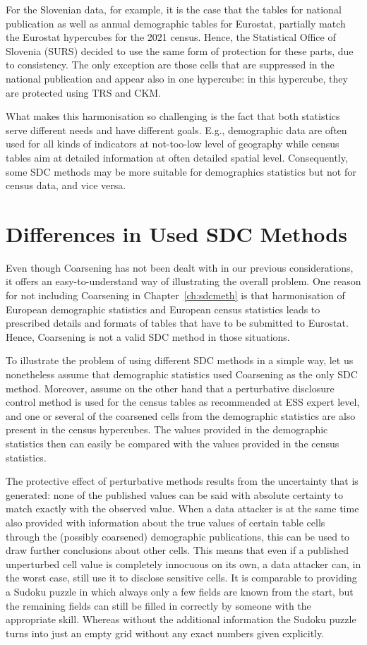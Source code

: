 For the Slovenian data, for example, it is the case that the tables for national publication as well as annual demographic tables for Eurostat, partially match the Eurostat hypercubes for the 2021 census. Hence, the Statistical Office of Slovenia (SURS) decided to use the same form of protection for these parts, due to consistency.
The only exception are those cells that are suppressed in the national publication and appear also in one hypercube: in this hypercube, they are protected using TRS and CKM.

What makes this harmonisation so challenging is the fact that both statistics serve different needs and have different goals. E.g., demographic data are often used for all kinds of indicators at not-too-low level of geography while census tables aim at detailed information at often detailed spatial level. Consequently, some SDC methods may be more suitable for demographics statistics but not for census data, and vice versa.




\section{Differences in Used SDC Methods}
Even though Coarsening has not been dealt with in our previous considerations, it offers an easy-to-understand way of illustrating the overall problem. One reason for not including Coarsening in Chapter~\ref{ch:sdcmeth} is that harmonisation of European demographic statistics and European census statistics leads to prescribed details and formats of tables that have to be submitted to Eurostat. Hence, Coarsening is not a valid SDC method in those situations.

To illustrate the problem of using different SDC methods in a simple way, let us nonetheless assume that demographic statistics used Coarsening as the only SDC method. Moreover, assume on the other hand that a perturbative disclosure control method is used for the census tables as recommended at ESS expert level, and one or several of the coarsened cells from the demographic statistics are also present in the census hypercubes. The values provided in the demographic statistics then can easily be compared with the values provided in the census statistics.

The protective effect of perturbative methods results from the uncertainty that is generated: none of the published values can be said with absolute certainty to match exactly with the observed value. 
When a data attacker is at the same time also provided with information about the true values of certain table cells through the (possibly coarsened) demographic publications, this can be used to draw further conclusions about other cells. This means that even if a published unperturbed cell value is completely innocuous on its own, a data attacker can, in the worst case, still use it to disclose sensitive cells. It is comparable to providing a Sudoku puzzle in which always only a few fields are known from the start, but the remaining fields can still be filled in correctly by someone with the appropriate skill. Whereas without the additional information the Sudoku puzzle turns into just an empty grid without any exact numbers given explicitly.

